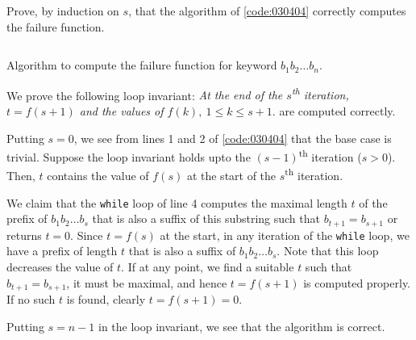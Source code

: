 \begin{exercise}\label{ex:030404}
    Prove, by induction on $s$, that the algorithm of \cref{code:030404} 
    correctly computes the failure function.
    \begin{listing}[!ht]
        \centering
        \inputminted{c}{03/04/04/ex030404.c}
        \caption{Algorithm to compute the failure function for keyword 
        $b_1b_2\ldots b_n$.}
        \label{code:030404}
    \end{listing}
\end{exercise}
\begin{solution}\label{sol:030404} 
    
    We prove the following loop invariant: \emph{At the end of the
    $s$\textsuperscript{th} iteration, $t = f(s+1)$ and the values of $f(k),\ 1
    \le k \le s + 1$}. are computed correctly.

    \noindent Putting $s = 0$, we see from lines 1 and 2 of \cref{code:030404}
    that the base case is trivial. Suppose the loop invariant holds upto the $(s
    - 1)$\textsuperscript{th} iteration ($s > 0$). Then, $t$ contains the value
    of $f(s)$ at the start of the $s$\textsuperscript{th} iteration.

    \noindent We claim that the \texttt{while} loop of line 4 computes the
    maximal length $t$ of the prefix of $b_1b_2\ldots b_s$ that is also a suffix
    of this substring such that $b_{t+1} = b_{s+1}$ or returns $t = 0$. Since $t
    = f(s)$ at the start, in any iteration of the \texttt{while} loop, we have a
    prefix of length $t$ that is also a suffix of $b_1b_2\ldots b_s$. Note that
    this loop decreases the value of $t$. If at any point, we find a suitable
    $t$ such that $b_{t+1} = b_{s+1}$, it must be maximal, and hence $t =
    f(s+1)$ is computed properly. If no such $t$ is found, clearly $t = f(s+1) =
    0$.  

    \noindent Putting $s = n-1$ in the loop invariant, we see that the algorithm
    is correct.
\end{solution}